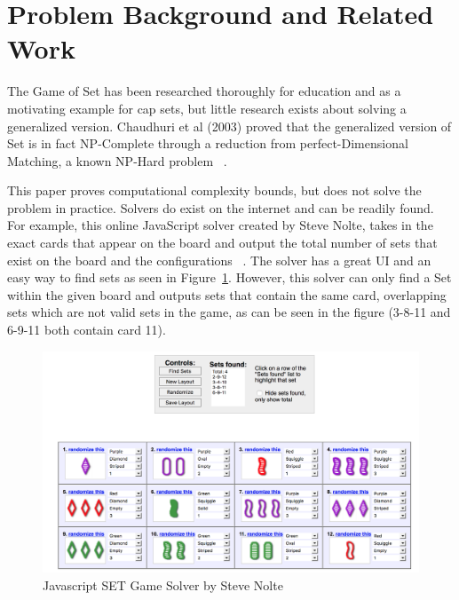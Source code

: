 \documentclass[pageno]{jpaper}
\begin{document}
\section{Problem Background and Related Work}


The Game of Set has been researched thoroughly for education and as a motivating example for cap sets, but little research exists about solving a generalized version. Chaudhuri et al (2003) proved that the generalized version of Set is in fact NP-Complete through a reduction from perfect-Dimensional Matching, a known NP-Hard problem ~\cite{chaudhuri}.  

This paper proves computational complexity bounds, but does not solve the problem in practice. Solvers do exist on the internet and can be readily found. For example, this online JavaScript solver created by Steve Nolte, takes in the exact cards that appear on the board and output the total number of sets that exist on the board and the configurations ~\cite{nolte}. The solver has a great UI and an easy way to find sets as seen in Figure~\ref{fig:nolteUI}. However, this solver can only find a Set within the given board and outputs sets that contain the same card, overlapping sets which are not valid sets in the game, as can be seen in the figure (3-8-11 and 6-9-11 both contain card 11). 

\begin{figure}[htbb]
\centering
\begin{minipage}[b]{.75\linewidth}
\includegraphics[width=\linewidth]{nolte.png}
\caption{Javascript SET Game Solver by Steve Nolte}
\label{fig:nolteUI}
\end{minipage}
\end{figure}
\end{document}
